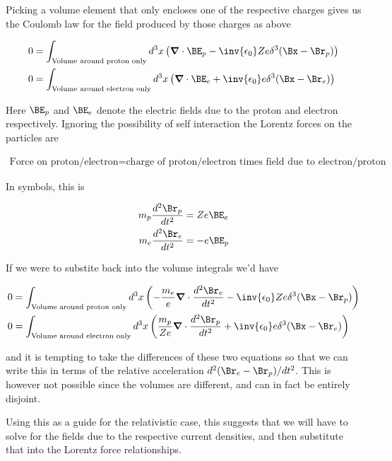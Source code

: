 Picking a volume element that only encloses one of the respective charges gives us the Coulomb law for the field produced by those charges as above

\begin{align}\label{eqn:nuclearInteraction:boo3}
0 &= \int_{\text{Volume around proton only}} d^3 x \left( \spacegrad \cdot \BE_p - \inv{\epsilon_0} Z e \delta^3(\Bx - \Br_p) \right) \\
0 &= \int_{\text{Volume around electron only}} d^3 x \left( \spacegrad \cdot \BE_e + \inv{\epsilon_0} e \delta^3(\Bx - \Br_e) \right)
\end{align}

Here $\BE_p$ and $\BE_e$ denote the electric fields due to the proton and electron respectively.  Ignoring the possibility of self interaction the Lorentz forces on the particles are

\begin{align*}
\text{Force on proton/electron} = \text{charge of proton/electron times field due to electron/proton}
\end{align*}

In symbols, this is

\begin{align}\label{eqn:nuclearInteraction:boo4}
m_p \frac{d^2 \Br_p}{dt^2} &= Z e \BE_e \\
m_e \frac{d^2 \Br_e}{dt^2} &= - e \BE_p
\end{align}

If we were to substite back into the volume integrals we'd have

\begin{align}\label{eqn:nuclearInteraction:boo5}
0 &= \int_{\text{Volume around proton only}} d^3 x \left( -\frac{m_e}{e}\spacegrad \cdot \frac{d^2 \Br_e}{dt^2} - \inv{\epsilon_0} Z e \delta^3(\Bx - \Br_p) \right) \\
0 &= \int_{\text{Volume around electron only}} d^3 x \left( \frac{m_p}{Z e}\spacegrad \cdot \frac{d^2 \Br_p}{dt^2} + \inv{\epsilon_0} e \delta^3(\Bx - \Br_e) \right)
\end{align}

and it is tempting to take the differences of these two equations so that we can write this in terms of the relative acceleration $d^2 (\Br_e - \Br_p)/dt^2$.  This is however not possible since the volumes are different, and can in fact be entirely disjoint.  

Using this as a guide for the relativistic case, this suggests that we will have to solve for the fields due to the respective current densities, and then substitute that into the Lorentz force relationships.

